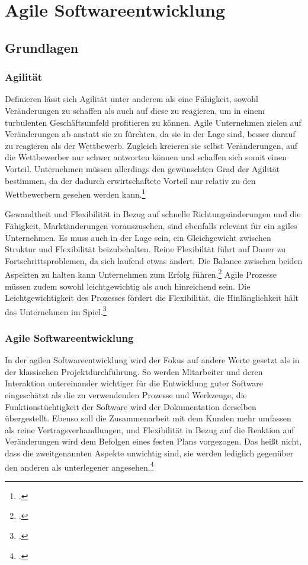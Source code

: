 \newpage
\section{Agile Softwareentwicklung}
\subsection{Grundlagen}
\subsubsection{Agilität}
Definieren lässt sich Agilität unter anderem als eine Fähigkeit, sowohl Veränderungen zu schaffen als auch auf diese zu reagieren, um in einem turbulenten Geschäftsumfeld profitieren zu können. Agile Unternehmen zielen auf Veränderungen ab anstatt sie zu fürchten, da sie in der Lage sind, besser darauf zu reagieren als der Wettbewerb. Zugleich kreieren sie selbst Veränderungen, auf die Wettbewerber nur schwer antworten können und schaffen sich somit einen Vorteil. Unternehmen müssen allerdings den gewünschten Grad der Agilität bestimmen, da der dadurch erwirtschaftete Vorteil nur relativ zu den Wettbewerbern gesehen werden kann.\footcite[Vgl.][Seite XXIII]{highsmith}

Gewandtheit und Flexibilität in Bezug auf schnelle Richtungsänderungen und die Fähigkeit, Marktänderungen vorauszusehen, sind ebenfalls relevant für ein agiles Unternehmen. Es muss auch in der Lage sein, ein Gleichgewicht zwischen Struktur und Flexibilität beizubehalten. Reine Flexibiltät führt auf Dauer zu Fortschrittsproblemen, da sich laufend etwas ändert. Die Balance zwischen beiden Aspekten zu halten kann Unternehmen zum Erfolg führen.\footcite[Vgl.][]{highsmith} Agile Prozesse müssen zudem sowohl leichtgewichtig als auch hinreichend sein. Die Leichtgewichtigkeit des Prozesses fördert die Flexibilität, die Hinlänglichkeit hält das Unternehmen im Spiel.\footcite[Vgl.][Seite 178]{cockburn}

\subsubsection{Agile Softwareentwicklung}
In der agilen Softwareentwicklung wird der Fokus auf andere Werte gesetzt als in der klassischen Projektdurchführung. So werden Mitarbeiter und deren Interaktion untereinander wichtiger für die Entwicklung guter Software eingeschätzt als die zu verwendenden Prozesse und Werkzeuge, die Funktionstüchtigkeit der Software wird der Dokumentation derselben übergestellt. Ebenso soll die Zusammenarbeit mit dem Kunden mehr umfassen als reine Vertragsverhandlungen, und Flexibilität in Bezug auf die Reaktion auf Veränderungen wird dem Befolgen eines festen Plans vorgezogen. Das heißt nicht, dass die zweitgenannten Aspekte unwichtig sind, sie werden lediglich gegenüber den anderen als unterlegener angesehen.\footcite[Vgl.][]{manifest1}

